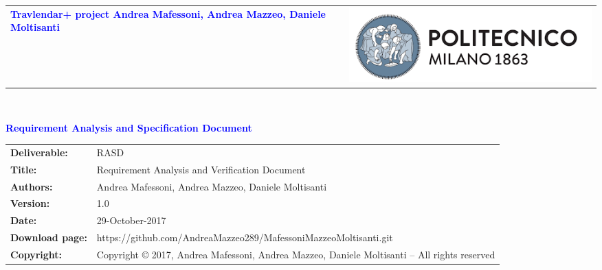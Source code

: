 
\usepackage{graphicx}
\usepackage{listings}
\renewcommand\textfraction{.1}
\usepackage{booktabs}

	
	
	\begin{titlepage}
		
		
		
		{\begin{table}[t!]
				\centering
				\begin{tabu} to \textwidth { X[1.3,r,p] X[1.7,l,p] }
					\textcolor{Blue}
					{\textbf{\small{Travlendar+ project Andrea Mafessoni, Andrea Mazzeo, Daniele Moltisanti}}} & \includegraphics[scale=0.5]{Images/PolimiLogo}
				\end{tabu}
		\end{table}}~\\ [7cm]
		
		
		\begin{flushleft}
			
			{\textcolor{Blue}{\textbf{\Huge{Requirement Analysis and Specification
							Document}}}} \\ [1cm]
			
		\end{flushleft}
		
	\end{titlepage}
	
	\begin{table}[h!]
		\begin{tabu} to \textwidth { X[0.3,r,p] X[0.7,l,p] }
			\hline
			
			\textbf{Deliverable:} & RASD\\
			\textbf{Title:} & Requirement Analysis and Verification Document \\
			\textbf{Authors:} & Andrea Mafessoni, Andrea Mazzeo, Daniele Moltisanti \\
			\textbf{Version:} & 1.0 \\ 
			\textbf{Date:} & 29-October-2017 \\
			\textbf{Download page:} & https://github.com/AndreaMazzeo289/MafessoniMazzeoMoltisanti.git \\
			\textbf{Copyright:} & Copyright © 2017, Andrea Mafessoni, Andrea Mazzeo, Daniele Moltisanti – All rights reserved \\
			\hline
		\end{tabu}
	\end{table}
	

